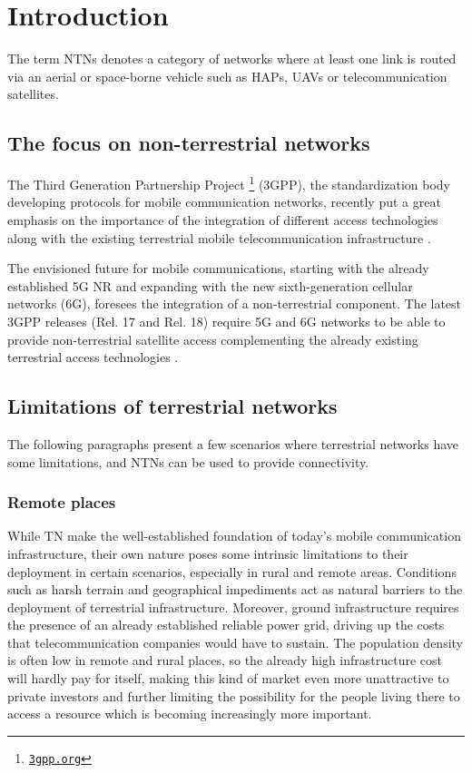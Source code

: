 
\chapter{Introduction}
\label{chp:intro}

The term \ac{NTNs} denotes a category of networks where at least one link is routed via an aerial or space-borne vehicle such as \ac{HAPs}, \ac{UAVs} or telecommunication satellites.

\section{The focus on non-terrestrial networks}
The Third Generation Partnership Project \footnote{\href{https://www.3gpp.org}{\texttt{3gpp.org}}} (3GPP), the standardization body developing protocols for mobile communication networks, recently put a great emphasis on the importance of the integration of different access technologies along with the existing terrestrial mobile telecommunication infrastructure \cite{3gpp-tr-21.917}.

The envisioned future for mobile communications, starting with the already established 5G \ac{NR} and expanding with the new sixth-generation cellular networks (6G), foresees the integration of a non-terrestrial component. The latest \ac{3GPP} releases (Rel. 17 and Rel. 18) require 5G and 6G networks to be able to provide non-terrestrial satellite access complementing the already existing terrestrial access technologies \cite{overview-rel-17-18-saad} \cite{5g-nr-communication-geo-leo-maattanen}.

\section{Limitations of terrestrial networks}
The following paragraphs present a few scenarios where terrestrial networks have some limitations, and \ac{NTNs} can be used to provide connectivity.

\subsection{Remote places}
While \ac{TN} make the well-established foundation of today’s mobile communication infrastructure, their own nature poses some intrinsic limitations to their deployment in certain scenarios, especially in rural and remote areas. Conditions such as harsh terrain and geographical impediments act as natural barriers to the deployment of terrestrial infrastructure. Moreover, ground infrastructure requires the presence of an already established reliable power grid, driving up the costs that telecommunication companies would have to sustain.
The population density is often low in remote and rural places, so the already high infrastructure cost will hardly pay for itself, making this kind of market even more unattractive to private investors and further limiting the possibility for the people living there to access a resource which is becoming increasingly more important.

